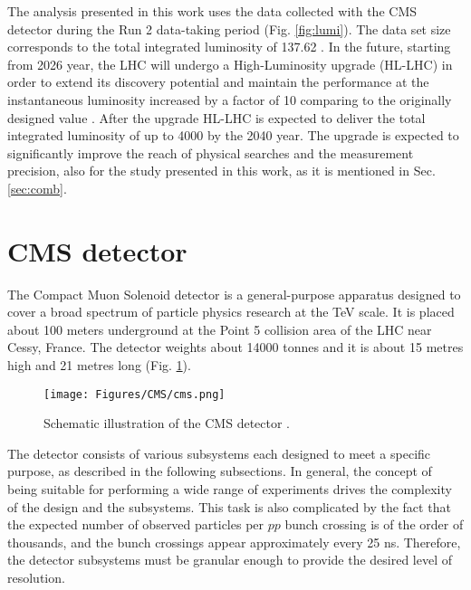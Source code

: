 The analysis presented in this work uses the data collected with the CMS detector during the Run 2 data-taking period (Fig. \ref{fig:lumi}). The data set size corresponds to the total integrated luminosity of 137.62 \ifb. In the future, starting from 2026 year, the LHC will undergo a High-Luminosity upgrade (HL-LHC) in order to extend its discovery potential and maintain the performance at the instantaneous luminosity increased by a factor of 10 comparing to the originally designed value \cite{ZurbanoFernandez:2020cco}. After the upgrade HL-LHC is expected to deliver the total integrated luminosity of up to 4000 \ifb by the 2040 year. The upgrade is expected to significantly improve the reach of physical searches and the measurement precision, also for the study presented in this work, as it is mentioned in Sec. \ref{sec:comb}.  


\section{CMS detector}\label{sec:cms}

The Compact Muon Solenoid detector \cite{CMS:2008xjf} is a general-purpose apparatus designed to cover a broad spectrum of particle physics research at the TeV scale. It is placed about 100 meters underground at the Point 5 collision area of the LHC near Cessy, France. The detector weights about 14000 tonnes and it is about 15 metres high and 21 metres long (Fig. \ref{fig:cms}). 

\begin{figure}[h!]
    \centering
    \texttt{[image: Figures/CMS/cms.png]}
    \caption{Schematic illustration of the CMS detector \cite{CMS:web-detector}.}
    \label{fig:cms}
\end{figure}

The detector consists of various subsystems each designed to meet a specific purpose, as described in the following subsections. In general, the concept of being suitable for performing a wide range of experiments drives the complexity of the design and the subsystems. This task is also complicated by the fact that the expected number of observed particles per $pp$ bunch crossing is of the order of thousands, and the bunch crossings appear approximately every 25 ns. Therefore, the detector subsystems must be granular enough to provide the desired level of resolution.


